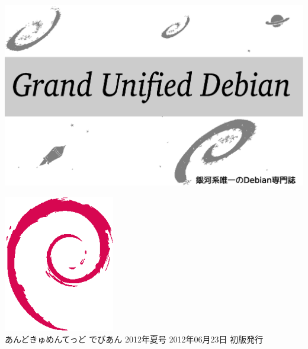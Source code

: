 \documentclass[mingoth,a4paper]{jsarticle}
\begin{document}
\begin{titlepage}
\thispagestyle{empty}

\hspace*{-2.5cm}
\includegraphics{image2012-natsu/gudeb.eps}\\
\vspace*{0.1cm}

\vspace*{-1cm}

\vspace*{-1.5cm}
\hspace*{11cm}\includegraphics[height=6cm]{image200502/openlogo-nd.eps}\\
\vspace*{0.1cm}
\hfill あんどきゅめんてっど でびあん 2012年夏号 2012年06月23日 初版発行
\end{titlepage}

\newpage
\thispagestyle{empty}\mbox{}
\newpage
\end{document}
